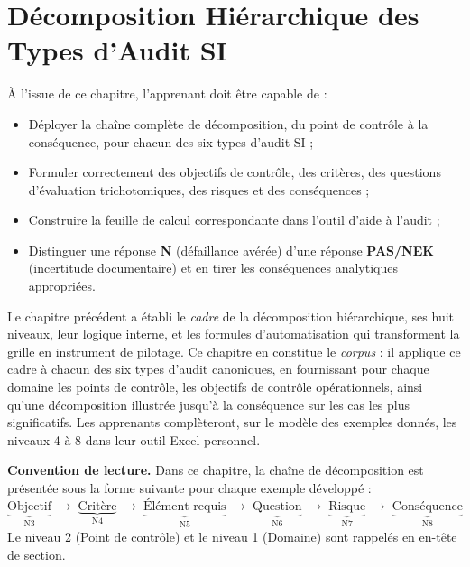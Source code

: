 
\chapter{Décomposition Hiérarchique des Types d'Audit SI}
\label{chap:decomposition}

\begin{boxobjectifs}
À l'issue de ce chapitre, l'apprenant doit être capable de :
\begin{itemize}
    \item Déployer la chaîne complète de décomposition, du point de contrôle à la conséquence, pour chacun des six types d'audit SI ;
    \item Formuler correctement des objectifs de contrôle, des critères, des questions d'évaluation trichotomiques, des risques et des conséquences ;
    \item Construire la feuille de calcul correspondante dans l'outil d'aide à l'audit ;
    \item Distinguer une réponse \textbf{N} (défaillance avérée) d'une réponse \textbf{PAS/NEK} (incertitude documentaire) et en tirer les conséquences analytiques appropriées.
\end{itemize}
\end{boxobjectifs}

Le chapitre précédent a établi le \textit{cadre} de la décomposition hiérarchique, ses huit niveaux, leur logique interne, et les formules d'automatisation qui transforment la grille en instrument de pilotage. Ce chapitre en constitue le \textit{corpus} : il applique ce cadre à chacun des six types d'audit canoniques, en fournissant pour chaque domaine les points de contrôle, les objectifs de contrôle opérationnels, ainsi qu'une décomposition illustrée jusqu'à la conséquence sur les cas les plus significatifs. Les apprenants complèteront, sur le modèle des exemples donnés, les niveaux 4 à 8 dans leur outil Excel personnel.

\begin{boxinfo}
\textbf{Convention de lecture.} Dans ce chapitre, la chaîne de décomposition est présentée sous la forme suivante pour chaque exemple développé :
\[
\underbrace{\text{Objectif}}_{\text{N3}} \;\longrightarrow\; \underbrace{\text{Critère}}_{\text{N4}} \;\longrightarrow\; \underbrace{\text{Élément requis}}_{\text{N5}} \;\longrightarrow\; \underbrace{\text{Question}}_{\text{N6}} \;\longrightarrow\; \underbrace{\text{Risque}}_{\text{N7}} \;\longrightarrow\; \underbrace{\text{Conséquence}}_{\text{N8}}
\]
Le niveau 2 (Point de contrôle) et le niveau 1 (Domaine) sont rappelés en en-tête de section.
\end{boxinfo}


